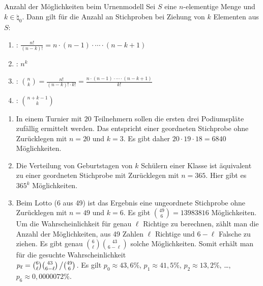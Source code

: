 \begin{Satz}{Anzahl der Möglichkeiten beim Urnenmodell}
    Sei $S$ eine $n$-elementige Menge und\\
    $k \in \natural_0$.
    Dann gilt für die Anzahl an Stichproben bei Ziehung von $k$ Elementen aus $S$:
    \begin{enumerate}
        \item
        :
        $\frac{n!}{(n - k)!} = n \cdot (n - 1) \cdot \dotsm \cdot (n - k + 1)$
        
        \item
        :
        $n^k$
        
        \item
        :
        $\binom{n}{k} = \frac{n!}{(n - k)! \cdot k!} =
        \frac{n \cdot (n - 1) \cdot \dotsm \cdot (n - k + 1)}{k!}$
        
        \item
        :
        $\binom{n + k - 1}{k}$
    \end{enumerate}
\end{Satz}

\begin{Bsp}
    \begin{enumerate}
        \item
        In einem Turnier mit $20$ Teilnehmern sollen die ersten drei Podiumspläte zufällig
        ermittelt werden.
        Das entspricht einer geordneten Stichprobe ohne Zurücklegen mit $n = 20$ und $k = 3$.
        Es gibt daher $20 \cdot 19 \cdot 18 = 6840$ Möglichkeiten.
        
        \item
        Die Verteilung von Geburtstagen von $k$ Schülern einer Klasse ist äquivalent zu
        einer geordneten Stichprobe mit Zurücklegen mit $n = 365$.
        Hier gibt es $365^k$ Möglichkeiten.
        
        \item
        Beim Lotto (6 aus 49) ist das Ergebnis eine ungeordnete Stichprobe ohne Zurücklegen
        mit $n = 49$ und $k = 6$.
        Es gibt $\binom{49}{6} = 13983816$ Möglichkeiten.\\
        Um die Wahrscheinlichkeit für genau $\ell$ Richtige zu berechnen, zählt man die
        Anzahl der Möglichkeiten, aus 49 Zahlen $\ell$ Richtige und $6 - \ell$ Falsche zu ziehen.
        Es gibt genau $\binom{6}{\ell} \binom{43}{6 - \ell}$ solche Möglichkeiten.
        Somit erhält man für die gesuchte Wahrscheinlichkeit\\
        $p_\ell = \binom{6}{\ell} \binom{43}{6 - \ell} \left/\binom{49}{6}\right.$.
        Es gilt $p_0 \approx 43{,}6\%$, $p_1 \approx 41{,}5\%$, $p_2 \approx 13{,}2\%$,
        \dots, $p_6 \approx 0{,}0000072\%$.
    \end{enumerate}
\end{Bsp}

